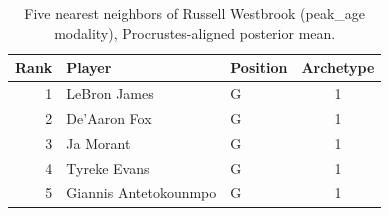 \begin{table}[htbp]
  \centering\small
  \begin{tabular}{rllc}
    \toprule
    Rank & Player & Position & Archetype \\
    \midrule
    1 & LeBron James & G & 1 \\
    2 & De'Aaron Fox & G & 1 \\
    3 & Ja Morant & G & 1 \\
    4 & Tyreke Evans & G & 1 \\
    5 & Giannis Antetokounmpo & G & 1 \\
    \bottomrule
  \end{tabular}
  \caption{Five nearest neighbors of Russell Westbrook (peak_age modality), Procrustes-aligned posterior mean.}
  \label{tab:Russell_Westbrook_neighbors_peak_age}
\end{table}

